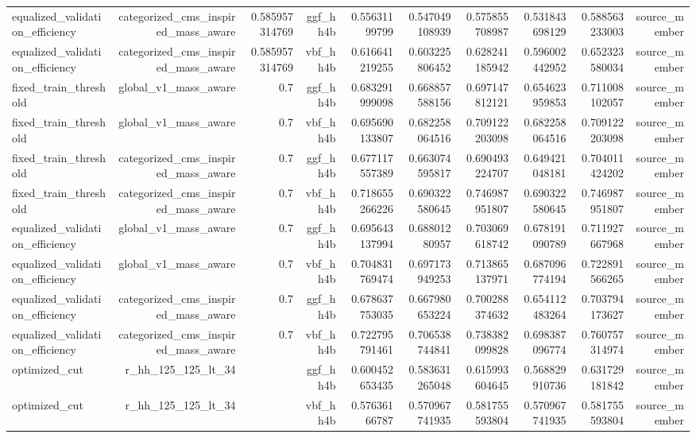 \begin{table}[htbp]
{\begin{tabular}{lrrrrrrrrr}
equalized\_validation\_efficiency & categorized\_cms\_inspired\_mass\_aware & 0.585957314769 & ggf\_hh4b & 0.55631199799 & 0.547049108939 & 0.575855708987 & 0.531843698129 & 0.588563233003 & source\_member \\
equalized\_validation\_efficiency & categorized\_cms\_inspired\_mass\_aware & 0.585957314769 & vbf\_hh4b & 0.616641219255 & 0.603225806452 & 0.628241185942 & 0.596002442952 & 0.652323580034 & source\_member \\
fixed\_train\_threshold & global\_v1\_mass\_aware & 0.7 & ggf\_hh4b & 0.683291999098 & 0.668857588156 & 0.697147812121 & 0.654623959853 & 0.711008102057 & source\_member \\
fixed\_train\_threshold & global\_v1\_mass\_aware & 0.7 & vbf\_hh4b & 0.695690133807 & 0.682258064516 & 0.709122203098 & 0.682258064516 & 0.709122203098 & source\_member \\
fixed\_train\_threshold & categorized\_cms\_inspired\_mass\_aware & 0.7 & ggf\_hh4b & 0.677117557389 & 0.663074595817 & 0.690493224707 & 0.649421048181 & 0.704011424202 & source\_member \\
fixed\_train\_threshold & categorized\_cms\_inspired\_mass\_aware & 0.7 & vbf\_hh4b & 0.718655266226 & 0.690322580645 & 0.746987951807 & 0.690322580645 & 0.746987951807 & source\_member \\
equalized\_validation\_efficiency & global\_v1\_mass\_aware & 0.7 & ggf\_hh4b & 0.695643137994 & 0.68801280957 & 0.703069618742 & 0.678191090789 & 0.711927667968 & source\_member \\
equalized\_validation\_efficiency & global\_v1\_mass\_aware & 0.7 & vbf\_hh4b & 0.704831769474 & 0.697173949253 & 0.713865137971 & 0.687096774194 & 0.722891566265 & source\_member \\
equalized\_validation\_efficiency & categorized\_cms\_inspired\_mass\_aware & 0.7 & ggf\_hh4b & 0.678637753035 & 0.667980653224 & 0.700288374632 & 0.654112483264 & 0.703794173627 & source\_member \\
equalized\_validation\_efficiency & categorized\_cms\_inspired\_mass\_aware & 0.7 & vbf\_hh4b & 0.722795791461 & 0.706538744841 & 0.738382099828 & 0.698387096774 & 0.760757314974 & source\_member \\
optimized\_cut & r\_hh\_125\_125\_lt\_34 &  & ggf\_hh4b & 0.600452653435 & 0.583631265048 & 0.615993604645 & 0.568829910736 & 0.631729181842 & source\_member \\
optimized\_cut & r\_hh\_125\_125\_lt\_34 &  & vbf\_hh4b & 0.57636166787 & 0.570967741935 & 0.581755593804 & 0.570967741935 & 0.581755593804 & source\_member \\
\bottomrule
\end{tabular}
}
\end{table}
